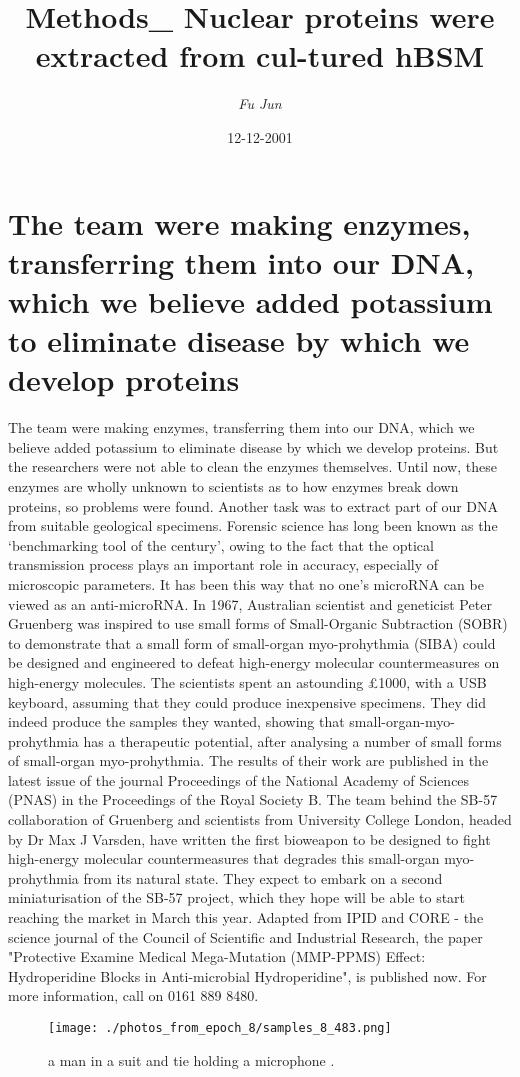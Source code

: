 \documentclass{article}%
\title{Methods\_ Nuclear proteins were extracted from cul{-}tured hBSM}%
\author{\textit{Fu Jun}}%
\date{12-12-2001}%
\begin{document}
%
\normalsize%
\maketitle%
\section{The team were making enzymes, transferring them into our DNA, which we believe added potassium to eliminate disease by which we develop proteins}%
\label{sec:Theteamweremakingenzymes,transferringthemintoourDNA,whichwebelieveaddedpotassiumtoeliminatediseasebywhichwedevelopproteins}%
The team were making enzymes, transferring them into our DNA, which we believe added potassium to eliminate disease by which we develop proteins. But the researchers were not able to clean the enzymes themselves. Until now, these enzymes are wholly unknown to scientists as to how enzymes break down proteins, so problems were found. Another task was to extract part of our DNA from suitable geological specimens.\newline%
Forensic science has long been known as the ‘benchmarking tool of the century’, owing to the fact that the optical transmission process plays an important role in accuracy, especially of microscopic parameters. It has been this way that no one’s microRNA can be viewed as an anti{-}microRNA.\newline%
In 1967, Australian scientist and geneticist Peter Gruenberg was inspired to use small forms of Small{-}Organic Subtraction (SOBR) to demonstrate that a small form of small{-}organ myo{-}prohythmia (SIBA) could be designed and engineered to defeat high{-}energy molecular countermeasures on high{-}energy molecules. The scientists spent an astounding £1000, with a USB keyboard, assuming that they could produce inexpensive specimens. They did indeed produce the samples they wanted, showing that small{-}organ{-}myo{-}prohythmia has a therapeutic potential, after analysing a number of small forms of small{-}organ myo{-}prohythmia.\newline%
The results of their work are published in the latest issue of the journal Proceedings of the National Academy of Sciences (PNAS) in the Proceedings of the Royal Society B.\newline%
The team behind the SB{-}57 collaboration of Gruenberg and scientists from University College London, headed by Dr Max J Varsden, have written the first bioweapon to be designed to fight high{-}energy molecular countermeasures that degrades this small{-}organ myo{-}prohythmia from its natural state. They expect to embark on a second miniaturisation of the SB{-}57 project, which they hope will be able to start reaching the market in March this year.\newline%
Adapted from IPID and CORE {-} the science journal of the Council of Scientific and Industrial Research, the paper "Protective Examine Medical Mega{-}Mutation (MMP{-}PPMS) Effect: Hydroperidine Blocks in Anti{-}microbial Hydroperidine", is published now. For more information, call on 0161 889 8480.\newline%

%


\begin{figure}[h!]%
\centering%
\texttt{[image: ./photos\_from\_epoch\_8/samples\_8\_483.png]}%
\caption{a man in a suit and tie holding a microphone .}%
\end{figure}

%
\end{document}

